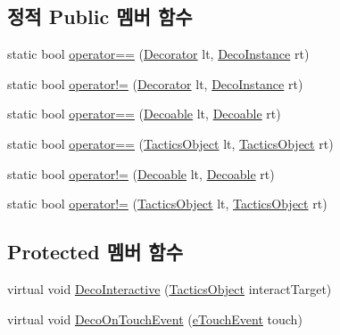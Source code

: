 \subsection*{정적 Public 멤버 함수}
\begin{DoxyCompactItemize}
\item 
static bool \hyperlink{class_m_c_n_1_1_decorator_a4c4c97e4a4dcf1a66e764740a5bbf3c6}{operator==} (\hyperlink{class_m_c_n_1_1_decorator}{Decorator} lt, \hyperlink{class_m_c_n_1_1_deco_instance}{Deco\+Instance} rt)
\item 
static bool \hyperlink{class_m_c_n_1_1_decorator_a89e2f61a0974c51610a0c8d14ef6962a}{operator!=} (\hyperlink{class_m_c_n_1_1_decorator}{Decorator} lt, \hyperlink{class_m_c_n_1_1_deco_instance}{Deco\+Instance} rt)
\item 
static bool \hyperlink{class_m_c_n_1_1_decoable_a6004bbc5f208c3031388c9d6e8f8359b}{operator==} (\hyperlink{class_m_c_n_1_1_decoable}{Decoable} lt, \hyperlink{class_m_c_n_1_1_decoable}{Decoable} rt)
\item 
static bool \hyperlink{class_tactics_object_a18f2979a4bf81dc755fbc17e425809f0}{operator==} (\hyperlink{class_tactics_object}{Tactics\+Object} lt, \hyperlink{class_tactics_object}{Tactics\+Object} rt)
\item 
static bool \hyperlink{class_m_c_n_1_1_decoable_aa75e4102ebd7265f577028b407534d27}{operator!=} (\hyperlink{class_m_c_n_1_1_decoable}{Decoable} lt, \hyperlink{class_m_c_n_1_1_decoable}{Decoable} rt)
\item 
static bool \hyperlink{class_tactics_object_a49e235618a22126faa6271243cd89710}{operator!=} (\hyperlink{class_tactics_object}{Tactics\+Object} lt, \hyperlink{class_tactics_object}{Tactics\+Object} rt)
\end{DoxyCompactItemize}
\subsection*{Protected 멤버 함수}
\begin{DoxyCompactItemize}
\item 
virtual void \hyperlink{class_m_c_n_1_1_decorator_a317f646a9053334fdbe28b9f1ae690a5}{Deco\+Interactive} (\hyperlink{class_tactics_object}{Tactics\+Object} interact\+Target)
\item 
virtual void \hyperlink{class_m_c_n_1_1_decorator_a7e4b756a1ab1d0791ddfa441102db8d2}{Deco\+On\+Touch\+Event} (\hyperlink{_touch_manager_8cs_ae33e321a424fe84ba8b2fdb81ad40a68}{e\+Touch\+Event} touch)
\end{DoxyCompactItemize}
